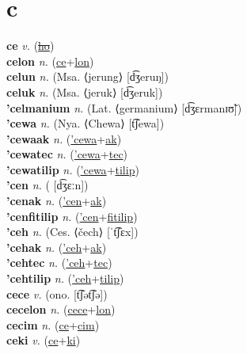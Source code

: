 \section{c}

\textbf{ce} \textit{v.} (\hyperref[ho]{\sout{ho}})
 \label{ce} \\
\textbf{celon} \textit{n.} (\hyperref[ce]{ce}+\hyperref[lon]{lon})
 \label{celon} \\
\textbf{celun} \textit{n.} (Msa. ⟨jerung⟩ [d͡ʒeruŋ])
 \label{celun} \\
\textbf{celuk} \textit{n.} (Msa. ⟨jeruk⟩ [d͡ʒeruk])
 \label{celuk} \\
\textbf{'celmanium} \textit{n.} (Lat. ⟨germanium⟩ [d͡ʒɛrmanɪʊ̃])
 \label{'celmanium} \\
\textbf{'cewa} \textit{n.} (Nya. ⟨Chewa⟩ [t͡ʃewa])
 \label{'cewa} \\
\textbf{'cewaak} \textit{n.} (\hyperref['cewa]{'cewa}+\hyperref[ak]{ak})
 \label{'cewaak} \\
\textbf{'cewatec} \textit{n.} (\hyperref['cewa]{'cewa}+\hyperref[tec]{tec})
 \label{'cewatec} \\
\textbf{'cewatilip} \textit{n.} (\hyperref['cewa]{'cewa}+\hyperref[tilip]{tilip})
 \label{'cewatilip} \\
\textbf{'cen} \textit{n.} ( [d͡ʒɛːn])
 \label{'cen} \\
\textbf{'cenak} \textit{n.} (\hyperref['cen]{'cen}+\hyperref[ak]{ak})
 \label{'cenak} \\
\textbf{'cenfitilip} \textit{n.} (\hyperref['cen]{'cen}+\hyperref[fitilip]{fitilip})
 \label{'cenfitilip} \\
\textbf{'ceh} \textit{n.} (Ces. ⟨čech⟩ [ˈt͡ʃɛx])
 \label{'ceh} \\
\textbf{'cehak} \textit{n.} (\hyperref['ceh]{'ceh}+\hyperref[ak]{ak})
 \label{'cehak} \\
\textbf{'cehtec} \textit{n.} (\hyperref['ceh]{'ceh}+\hyperref[tec]{tec})
 \label{'cehtec} \\
\textbf{'cehtilip} \textit{n.} (\hyperref['ceh]{'ceh}+\hyperref[tilip]{tilip})
 \label{'cehtilip} \\
\textbf{cece} \textit{v.} (ono. [t͡ʃət͡ʃə])
 \label{cece} \\
\textbf{cecelon} \textit{n.} (\hyperref[cece]{cece}+\hyperref[lon]{lon})
 \label{cecelon} \\
\textbf{cecim} \textit{n.} (\hyperref[ce]{ce}+\hyperref[cim]{cim})
 \label{cecim} \\
\textbf{ceki} \textit{v.} (\hyperref[ce]{ce}+\hyperref[ki]{ki})
